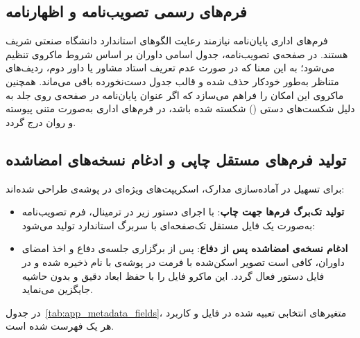 \subsection{فرم‌های رسمی تصویب‌نامه و اظهارنامه}

فرم‌های اداری پایان‌نامه نیازمند رعایت الگوهای استاندارد دانشگاه صنعتی شریف هستند. در صفحه‌ی تصویب‌نامه، جدول اسامی داوران بر اساس شروط ماکروی  تنظیم می‌شود؛ به این معنا که در صورت عدم تعریف استاد مشاور یا داور دوم، ردیف‌های متناظر به‌طور خودکار حذف شده و قالب جدول دست‌نخورده باقی می‌ماند. همچنین ماکروی  این امکان را فراهم می‌سازد که اگر عنوان پایان‌نامه در صفحه‌ی روی جلد به دلیل شکست‌های دستی (\code{{\textbackslash}{\textbackslash}}) شکسته شده باشد، در فرم‌های اداری به‌صورت متنی پیوسته و روان درج گردد.


\subsection{تولید فرم‌های مستقل چاپی و ادغام نسخه‌های امضاشده}

برای تسهیل در آماده‌سازی مدارک، اسکریپت‌های ویژه‌ای در پوشه‌ی  طراحی شده‌اند:
\begin{itemize}
    \item \textbf{تولید تک‌برگ فرم‌ها جهت چاپ}: با اجرای دستور زیر در ترمینال، فرم تصویب‌نامه به‌صورت یک فایل  مستقل تک‌صفحه‌ای با سربرگ استاندارد تولید می‌شود:
    \begin{latin}
    \end{latin}
    \item \textbf{ادغام نسخه‌ی امضاشده پس از دفاع}: پس از برگزاری جلسه‌ی دفاع و اخذ امضای داوران، کافی است تصویر اسکن‌شده با فرمت  در پوشه‌ی  با نام  ذخیره شده و در فایل  دستور  فعال گردد. این ماکرو فایل را با حفظ ابعاد دقیق  و بدون حاشیه جایگزین می‌نماید.
\end{itemize}

در جدول~\ref{tab:app_metadata_fields}، متغیرهای انتخابی تعبیه شده در فایل  و کاربرد هر یک فهرست شده است.

